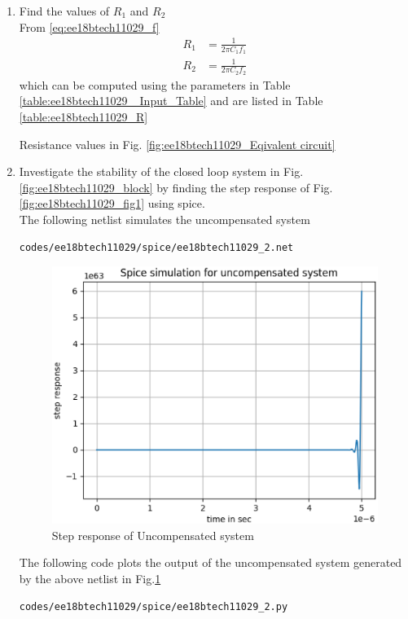 \begin{enumerate}[label=\thesection.\arabic*.,ref=\thesection.\theenumi]
\item Find the values of $R_{1}$ and $R_{2}$\\
\solution From \eqref{eq:ee18btech11029_f}
%
\begin{align}
    R_{1} &= \frac{1}{2\pi C_{1} f_{1}}\\
    R_{2}  &= \frac{1}{2\pi C_{2}f_{2}}
\end{align}
%
which can be computed using the parameters in Table 
\ref{table:ee18btech11029_ Input_Table} and are listed in Table \ref{table:ee18btech11029_R}
%
\begin{table}[!t]
\centering

\caption{Resistance values in Fig. 	\ref{fig:ee18btech11029_Eqivalent circuit}
}
\label{table:ee18btech11029_R}
\end{table}
%
\item Investigate  the stability of the closed loop system in Fig. 	\ref{fig:ee18btech11029_block} by finding the step response of Fig. 	\ref{fig:ee18btech11029_fig1}
using spice.
\\
\solution The following netlist simulates the uncompensated system
\begin{lstlisting}
codes/ee18btech11029/spice/ee18btech11029_2.net
\end{lstlisting}

\begin{figure}[!h]
	\centering
		\includegraphics[width=\columnwidth]{./figs/ee18btech11029/spiceuncompensated.eps}
	\caption{Step response of Uncompensated system}
	\label{fig:ee18btech11029_9}
\end{figure}
The following code plots the output of the uncompensated system generated by the above netlist in Fig.\ref{fig:ee18btech11029_9}
\begin{lstlisting}
codes/ee18btech11029/spice/ee18btech11029_2.py
\end{lstlisting}
\end{enumerate}
%
